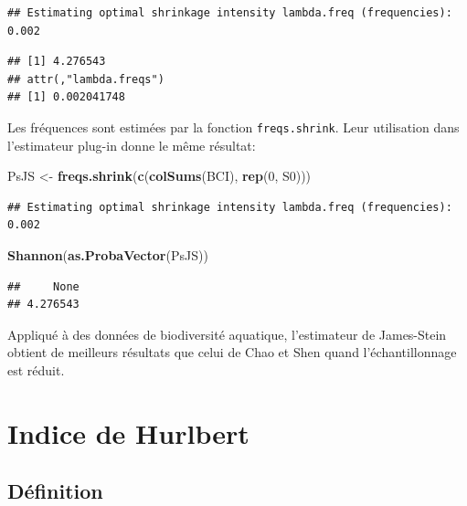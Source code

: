 \documentclass[
  11pt,
  french,
  a4paper,
  extrafontsizes,onecolumn,openright
  ]{memoir}
\newenvironment{Shaded}{\begin{snugshade}}{\end{snugshade}}
\newcommand{\DecValTok}[1]{\textcolor[rgb]{0.00,0.00,0.81}{#1}}
\newcommand{\KeywordTok}[1]{\textcolor[rgb]{0.13,0.29,0.53}{\textbf{#1}}}
\newcommand{\NormalTok}[1]{#1}
\newcommand{\StringTok}[1]{\textcolor[rgb]{0.31,0.60,0.02}{#1}}
\begin{document}
\begin{verbatim}
## Estimating optimal shrinkage intensity lambda.freq (frequencies): 0.002
\end{verbatim}

\begin{verbatim}
## [1] 4.276543
## attr(,"lambda.freqs")
## [1] 0.002041748
\end{verbatim}

\normalsize

Les fréquences sont estimées par la fonction \texttt{freqs.shrink}.
Leur utilisation dans l'estimateur plug-in donne le même résultat:

\scriptsize

\begin{Shaded}
\begin{Highlighting}[]
\NormalTok{PsJS <-}\StringTok{ }\KeywordTok{freqs.shrink}\NormalTok{(}\KeywordTok{c}\NormalTok{(}\KeywordTok{colSums}\NormalTok{(BCI), }\KeywordTok{rep}\NormalTok{(}\DecValTok{0}\NormalTok{, S0)))}
\end{Highlighting}
\end{Shaded}

\begin{verbatim}
## Estimating optimal shrinkage intensity lambda.freq (frequencies): 0.002
\end{verbatim}

\begin{Shaded}
\begin{Highlighting}[]
\KeywordTok{Shannon}\NormalTok{(}\KeywordTok{as.ProbaVector}\NormalTok{(PsJS))}
\end{Highlighting}
\end{Shaded}

\begin{verbatim}
##     None 
## 4.276543
\end{verbatim}

\normalsize

Appliqué à des données de biodiversité aquatique, l'estimateur de James-Stein obtient de meilleurs résultats que celui de Chao et Shen \autocite{Liu2015} quand l'échantillonnage est réduit.

\hypertarget{sec:Hurlbert}{%
\section{Indice de Hurlbert}\label{sec:Hurlbert}}

\hypertarget{duxe9finition-2}{%
\subsection{Définition}\label{duxe9finition-2}}
\end{document}
